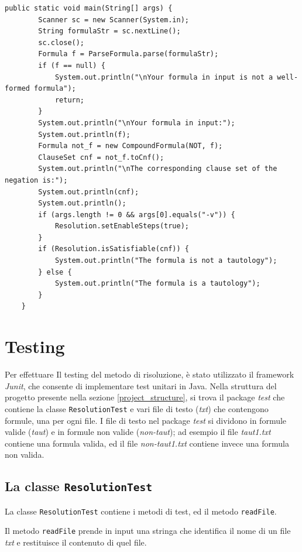 \documentclass[a4paper,12pt]{report}
\begin{document}
\begin{minipage}{\linewidth}
    \small
    \begin{lstlisting}[caption={Metodo \texttt{main} della classe \texttt{App}}, label={method:main}]
    public static void main(String[] args) {
        Scanner sc = new Scanner(System.in);
        String formulaStr = sc.nextLine();
        sc.close();
        Formula f = ParseFormula.parse(formulaStr);
        if (f == null) {
            System.out.println("\nYour formula in input is not a well-formed formula");
            return;
        }
        System.out.println("\nYour formula in input:");
        System.out.println(f);
        Formula not_f = new CompoundFormula(NOT, f);
        ClauseSet cnf = not_f.toCnf();  
        System.out.println("\nThe corresponding clause set of the negation is:");
        System.out.println(cnf);
        System.out.println();
        if (args.length != 0 && args[0].equals("-v")) {
            Resolution.setEnableSteps(true);
        }
        if (Resolution.isSatisfiable(cnf)) {
            System.out.println("The formula is not a tautology");
        } else {
            System.out.println("The formula is a tautology");
        }
    }
    \end{lstlisting}
\end{minipage}
% 
% 
\chapter{Testing}
\label{testing}
Per effettuare Il testing del metodo di risoluzione, è stato utilizzato il framework \emph{Junit}, che consente di implementare test unitari in Java. Nella struttura del progetto presente nella sezione \ref{project_structure}, si trova il package \emph{test} che contiene la classe \texttt{ResolutionTest} e vari file di testo (\emph{txt}) che contengono formule, una per ogni file. I file di testo nel package \emph{test} si dividono in formule valide (\emph{taut}) e in formule non valide (\emph{non-taut}); ad esempio il file \emph{taut1.txt} contiene una formula valida, ed il file \emph{non-taut1.txt} contiene invece una formula non valida.

\section{La classe \texttt{ResolutionTest}}
La classe \texttt{ResolutionTest} contiene i metodi di test, ed il metodo \texttt{readFile}.

Il metodo \texttt{readFile} prende in input una stringa che identifica il nome di un file \emph{txt} e restituisce il contenuto di quel file.
\end{document}
